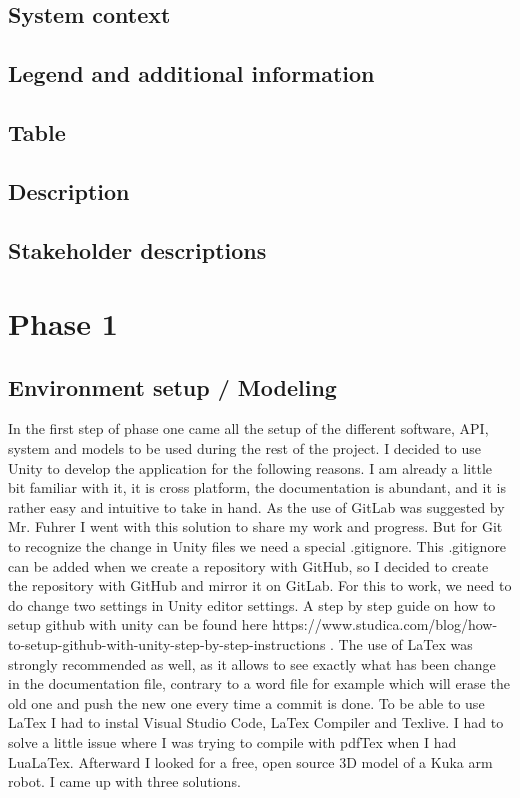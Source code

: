 \documentclass{scrartcl}
\begin{document}
\subsection{System context}
\subsection{Legend and additional information}
\subsection{Table}
\subsection{Description}
\subsection{Stakeholder descriptions}

\clearpage

\section{Phase 1}
\subsection{Environment setup / Modeling}
In the first step of phase one came all the setup of the different software, API, 
system and models to be used during the rest of the project. I decided to use Unity to develop the application for the following reasons.
I am already a little bit familiar with it, it is cross platform, the documentation is abundant, 
and it is rather easy and intuitive to take in hand. As the use of GitLab was suggested by Mr. Fuhrer 
I went with this solution to share my work and progress. But for Git to recognize the change in Unity 
files we need a special .gitignore. This .gitignore can be added when we create a repository with GitHub, 
so I decided to create the repository with GitHub and mirror it on GitLab. For this to work, we need to do 
change two settings in Unity editor settings. A step by step guide on how to setup github with unity 
can be found here https://www.studica.com/blog/how-to-setup-github-with-unity-step-by-step-instructions . 
The use of LaTex was strongly recommended as well, as it allows to see exactly what has been change in the documentation file, 
contrary to a word file for example which will erase the old one and push the new one every time a commit is done. 
To be able to use LaTex I had to instal Visual Studio Code, LaTex Compiler and Texlive. 
I had to solve a little issue where I was trying to compile with pdfTex when I had LuaLaTex. 
Afterward I looked for a free, open source 3D model of a Kuka arm robot. I came up with three solutions.
\end{document}
